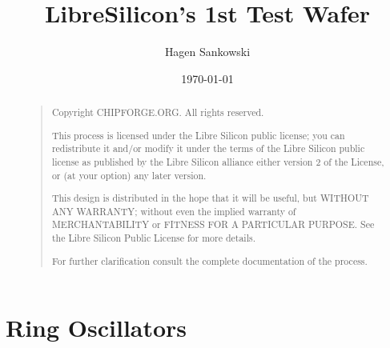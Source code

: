 \documentclass[10pt,a4paper,twoside]{report}
\title{LibreSilicon's 1st Test Wafer}
\author{Hagen Sankowski}
\date{\today}
\begin{document}
\maketitle
\begin{abstract}
\begin{quote}
Copyright  CHIPFORGE.ORG. All rights reserved.

This process is licensed under the Libre Silicon public license; you can redistribute it and/or modify it under the terms of the Libre Silicon public license as published by the Libre Silicon alliance either version 2 of the License, or (at your option) any later version.

This design is distributed in the hope that it will be useful, but WITHOUT ANY WARRANTY; without even the implied warranty of MERCHANTABILITY or FITNESS FOR A PARTICULAR PURPOSE. See the Libre Silicon Public License for more details.

For further clarification consult the complete documentation of the process.
\end{quote}
\end{abstract}

\clearpage

\pagestyle{headings}

\chapter{Ring Oscillators}

\clearpage
\end{document}
